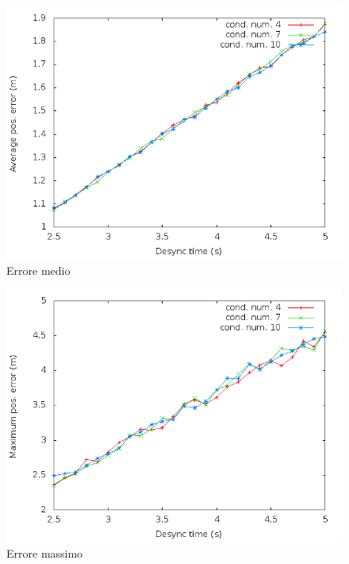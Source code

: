 \documentclass[Lau,binding=0.6cm]{sapthesis}
\begin{document}
\begin{figure}
    \centering
    \includegraphics[scale=0.5]{squaresimulation/avposerrorreq3preempt1drop0speed1.png}
    \caption{Errore medio}
    \label{fig:squaresimulation/avposerrorreq3preempt1drop0speed1}
\end{figure}

\begin{figure}
    \centering
    \includegraphics[scale=0.5]{squaresimulation/maxposerrorreq3preempt1drop0speed1.png}
    \caption{Errore massimo}
    \label{fig:squaresimulation/maxposerrorreq3preempt1drop0speed1}
\end{figure}
\end{document}
